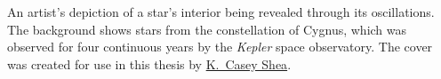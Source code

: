 \vspace*{0.5cm}
 An artist's depiction of a star's interior being revealed through its oscillations. 
The background shows stars from the constellation of Cygnus, which was observed for four continuous years by the \emph{Kepler} space observatory. 
The cover was created for use in this thesis by \href{http://kcaseyshea.com/}{K.\ Casey Shea}.
\clearpage